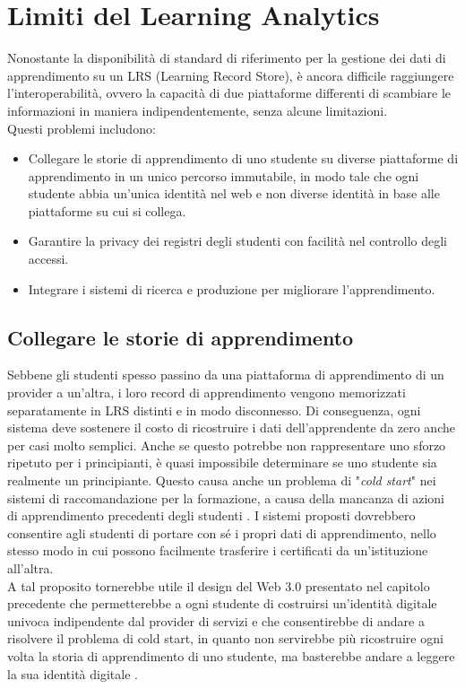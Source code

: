 \section{Limiti del Learning Analytics}
Nonostante la disponibilità di standard di riferimento per la gestione dei dati di apprendimento su un LRS (Learning Record Store), è ancora difficile raggiungere l'interoperabilità,
ovvero la capacità di due piattaforme differenti di scambiare le informazioni in maniera indipendentemente, senza alcune limitazioni.
\\Questi problemi includono:
\begin{itemize}
    \item Collegare le storie di apprendimento di uno studente su diverse piattaforme di apprendimento in un unico percorso immutabile, in modo tale che ogni studente abbia un'unica identità nel web e non diverse identità in base alle piattaforme su cui si collega.
    \item Garantire la privacy dei registri degli studenti con facilità nel controllo degli accessi.
    \item Integrare i sistemi di ricerca e produzione per migliorare l'apprendimento.
\end{itemize}

\subsection{Collegare le storie di apprendimento }
Sebbene gli studenti spesso passino da una piattaforma di apprendimento di un provider a un'altra, i loro record di apprendimento vengono memorizzati separatamente in LRS distinti e in modo disconnesso. 
Di conseguenza, ogni sistema deve sostenere il costo di ricostruire i dati dell'apprendente da zero anche per casi molto semplici. Anche se questo potrebbe non rappresentare uno sforzo ripetuto per i principianti, è quasi impossibile determinare se uno studente sia realmente un principiante.
Questo causa anche un problema di "\textit{cold start}" nei sistemi di raccomandazione per la formazione, a causa della mancanza di azioni di apprendimento precedenti degli studenti \cite{barnes_stamper_2008}.
I sistemi proposti dovrebbero consentire agli studenti di portare con sé i propri dati di apprendimento,
nello stesso modo in cui possono facilmente trasferire i certificati da un'istituzione all'altra. 
\\A tal proposito tornerebbe utile il design del Web 3.0 presentato nel capitolo precedente che permetterebbe a ogni studente di costruirsi un'identità digitale univoca indipendente dal provider di servizi e che consentirebbe di
andare a risolvere il problema di cold start, in quanto non servirebbe più ricostruire ogni volta la storia di apprendimento di uno studente, ma basterebbe andare a leggere la sua identità digitale \cite{ocheja2018connecting}.

